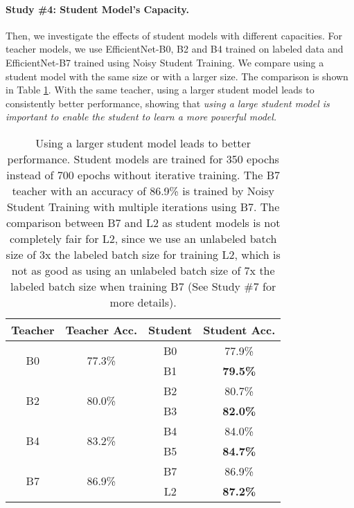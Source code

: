 \documentclass[10pt,twocolumn,letterpaper]{article}
\begin{document}
\paragraph{Study \#4: Student Model's Capacity.} Then, we investigate the effects of student models with different capacities. For teacher models, we use EfficientNet-B0, B2 and B4 trained on labeled data and EfficientNet-B7 trained using Noisy Student Training. We compare using a student model with the same size or with a larger size. The comparison is shown in Table  \ref{tab:abl_student_model}. With the same teacher, using a larger student model leads to consistently better performance, showing that \emph{using a large student model is important to enable the student to learn a more powerful model.}
\begin{table}[h!]
\footnotesize
    \centering
        \begin{tabular}{cc|cc}
        \toprule 
         Teacher & Teacher Acc. & Student  & Student Acc.  \\
        \midrule      
	    \multirow{2}{*}{B0} & \multirow{2}{*}{77.3\%} & B0 & 77.9\% \\
	     & & B1 & \bf 79.5\% \\
	    \midrule
	    \multirow{2}{*}{B2} & \multirow{2}{*}{80.0\%}  & B2 & 80.7\% \\
	     & & B3 & \bf 82.0\% \\
	    \midrule
	    \multirow{2}{*}{B4} & \multirow{2}{*}{83.2\%} & B4 & 84.0\% \\
	     & & B5 & \bf 84.7\% \\
	     \midrule
	    \multirow{2}{*}{B7} & \multirow{2}{*}{86.9\%} & B7 & 86.9\% \\
	     & & L2 & \bf 87.2\% \\
        \bottomrule
        \end{tabular}
    \caption{Using a larger student model leads to better performance. Student models are trained for 350 epochs instead of 700 epochs without iterative training. The B7 teacher with an accuracy of 86.9\% is trained by Noisy Student Training with multiple iterations using B7. The comparison between B7 and L2 as student models is not completely fair for L2, since we use an unlabeled batch size of 3x the labeled batch size for training L2, which is not as good as using an unlabeled batch size of 7x the labeled batch size when training B7 (See Study \#7 for more details). }
    \label{tab:abl_student_model}
\end{table}
\end{document}
